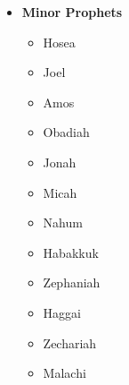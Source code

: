 \begin{multicols}{3}
\begin{itemize}
	\item \textbf{Minor Prophets}
	\begin{itemize}
		\item Hosea
		\item Joel
		\item Amos
		\item Obadiah
		\item Jonah
		\item Micah
		\item Nahum
		\item Habakkuk
		\item Zephaniah
		\item Haggai
		\item Zechariah
		\item Malachi
	\end{itemize}
\end{itemize}
\end{multicols}